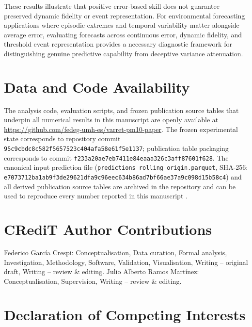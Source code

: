 \documentclass[12pt]{article}
\begin{document}
These results illustrate that positive error-based skill does not guarantee preserved dynamic fidelity or event representation. For environmental forecasting applications where episodic extremes and temporal variability matter alongside average error, evaluating forecasts across continuous error, dynamic fidelity, and threshold event representation provides a necessary diagnostic framework for distinguishing genuine predictive capability from deceptive variance attenuation.

\section*{Data and Code Availability}
\label{sec:data_availability}

The analysis code, evaluation scripts, and frozen publication source tables that underpin all numerical results in this manuscript are openly available at \url{https://github.com/fedeg-umh-es/varret-pm10-paper}. The frozen experimental state corresponds to repository commit \texttt{95c9cbdc8c582f5657523c404afa58e61f5e1137}; publication table packaging corresponds to commit \texttt{f233a20ae7eb7411e84eaaa326c3aff87601f628}. The canonical input prediction file (\texttt{predictions\_rolling\_origin.parquet}, SHA-256: \texttt{e7073712ba1a}\allowbreak\texttt{b9f3de29621dfa9c96eec634b86ad7bf66ae37a9c098d15b58c4}) and all derived publication source tables are archived in the repository and can be used to reproduce every number reported in this manuscript \citep{sandve2013}.

\section*{CRediT Author Contributions}

Federico Garc\'ia Crespi: Conceptualisation, Data curation, Formal analysis, Investigation, Methodology, Software, Validation, Visualisation, Writing -- original draft, Writing -- review \& editing.
Julio Alberto Ramos Mart\'inez: Conceptualisation, Supervision, Writing -- review \& editing.

\section*{Declaration of Competing Interests}
\end{document}
